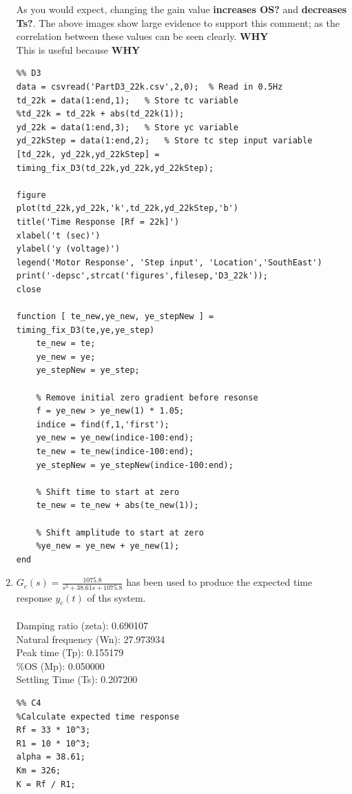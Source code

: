 \documentclass[11pt,a4paper]{article}
\begin{document}
\begin{enumerate}
	As you would expect, changing the gain value \textbf{increases OS?} and \textbf{decreases Ts?}. The above images show large evidence to support this comment; as the correlation between these values can be seen clearly. \textbf{WHY}\\
	This is useful because \textbf{WHY}
\pagebreak
	\begin{lstlisting}
%% D3
data = csvread('PartD3_22k.csv',2,0);  % Read in 0.5Hz
td_22k = data(1:end,1);   % Store tc variable
%td_22k = td_22k + abs(td_22k(1));
yd_22k = data(1:end,3);   % Store yc variable
yd_22kStep = data(1:end,2);   % Store tc step input variable
[td_22k, yd_22k,yd_22kStep] = timing_fix_D3(td_22k,yd_22k,yd_22kStep);

figure
plot(td_22k,yd_22k,'k',td_22k,yd_22kStep,'b')
title('Time Response [Rf = 22k]')
xlabel('t (sec)')
ylabel('y (voltage)')
legend('Motor Response', 'Step input', 'Location','SouthEast')
print('-depsc',strcat('figures',filesep,'D3_22k'));
close

function [ te_new,ye_new, ye_stepNew ] = timing_fix_D3(te,ye,ye_step)
    te_new = te;
    ye_new = ye;
    ye_stepNew = ye_step;
    
    % Remove initial zero gradient before resonse
    f = ye_new > ye_new(1) * 1.05;
    indice = find(f,1,'first');
    ye_new = ye_new(indice-100:end);
    te_new = te_new(indice-100:end);
    ye_stepNew = ye_stepNew(indice-100:end);

    % Shift time to start at zero
    te_new = te_new + abs(te_new(1));

    % Shift amplitude to start at zero
    %ye_new = ye_new + ye_new(1);
end
	\end{lstlisting}
	
	
	
	
\pagebreak	
	\item 
	$G_c(s) = \frac{1075.8}{s^2 + 38.61s + 1075.8}$ has been used to produce the expected time response $y_c(t)$ of ths system.\\\\
	Damping ratio (zeta): 0.690107\\
	Natural frequency (Wn): 27.973934\\
	Peak time (Tp): 0.155179\\
	\%OS (Mp): 0.050000\\
	Settling Time (Ts): 0.207200
	\begin{lstlisting}
%% C4
%Calculate expected time response
Rf = 33 * 10^3;
R1 = 10 * 10^3;
alpha = 38.61;
Km = 326;
K = Rf / R1;


\end{lstlisting}
\end{enumerate}
\end{document}
